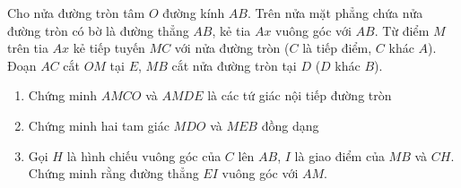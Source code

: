 \begin{ex}%
Cho nửa đường tròn tâm $O$ đường kính $AB$. Trên nửa mặt phẳng chứa nửa đường tròn có bờ là đường thẳng $AB$, kẻ tia $Ax$ vuông góc với $AB$. Từ điểm $M$ trên tia $Ax$ kẻ tiếp tuyến $MC$ với nửa đường tròn ($C$ là tiếp điểm, $C$ khác $A$). Đoạn $AC$ cắt $OM$ tại $E$, $MB$ cắt nửa đường tròn tại $D$ ($D$ khác $B$).
\begin{enumerate}
\item Chứng minh $AMCO$ và $AMDE$ là các tứ giác nội tiếp đường tròn
\item Chứng minh hai tam giác $MDO$ và $MEB$ đồng dạng
\item Gọi $H$ là hình chiếu vuông góc của $C$ lên $AB$, $I$ là giao điểm của $MB$ và $CH$. Chứng minh rằng đường thẳng $EI$ vuông góc với $AM$.
\end{enumerate}

\loigiai
    {
    \begin{center}
\end{center}
    
}
\end{ex}
